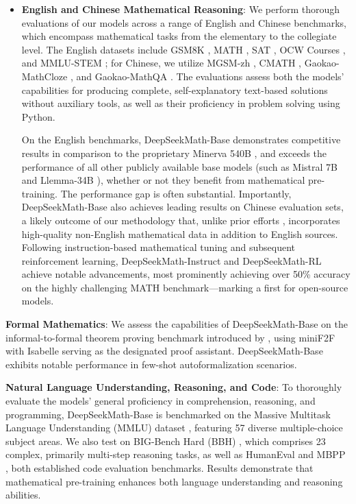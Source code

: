 \begin{itemize}[topsep=0pt]
    \item \textbf{English and Chinese Mathematical Reasoning}: We perform thorough evaluations of our models across a range of English and Chinese benchmarks, which encompass mathematical tasks from the elementary to the collegiate level. The English datasets include GSM8K \citep{gsm8k}, MATH \citep{MATH}, SAT \citep{llemma}, OCW Courses \citep{minerva}, and MMLU-STEM \citep{mmlu}; for Chinese, we utilize MGSM-zh \citep{mgsm}, CMATH \citep{wei2023cmath}, Gaokao-MathCloze \citep{agieval}, and Gaokao-MathQA \citep{agieval}. The evaluations assess both the models’ capabilities for producing complete, self-explanatory text-based solutions without auxiliary tools, as well as their proficiency in problem solving using Python.
    
    On the English benchmarks, DeepSeekMath-Base demonstrates competitive results in comparison to the proprietary Minerva 540B \citep{minerva}, and exceeds the performance of all other publicly available base models (such as Mistral 7B \citep{mistral} and Llemma-34B \citep{llemma}), whether or not they benefit from mathematical pre-training. The performance gap is often substantial. Importantly, DeepSeekMath-Base also achieves leading results on Chinese evaluation sets, a likely outcome of our methodology that, unlike prior efforts \citep{minerva, llemma}, incorporates high-quality non-English mathematical data in addition to English sources. Following instruction-based mathematical tuning and subsequent reinforcement learning, DeepSeekMath-Instruct and DeepSeekMath-RL achieve notable advancements, most prominently achieving over 50\% accuracy on the highly challenging MATH benchmark—marking a first for open-source models.
\end{itemize}

\item \textbf{Formal Mathematics}: We assess the capabilities of DeepSeekMath-Base on the informal-to-formal theorem proving benchmark introduced by \citep{dsp_proof}, using miniF2F \citep{minif2f} with Isabelle \citep{isabelle} serving as the designated proof assistant. DeepSeekMath-Base exhibits notable performance in few-shot autoformalization scenarios.
\item \textbf{Natural Language Understanding, Reasoning, and Code}: To thoroughly evaluate the models’ general proficiency in comprehension, reasoning, and programming, DeepSeekMath-Base is benchmarked on the Massive Multitask Language Understanding (MMLU) dataset \citep{mmlu}, featuring 57 diverse multiple-choice subject areas. We also test on BIG-Bench Hard (BBH) \citep{bbh}, which comprises 23 complex, primarily multi-step reasoning tasks, as well as HumanEval \citep{codex} and MBPP \citep{mbpp}, both established code evaluation benchmarks. Results demonstrate that mathematical pre-training enhances both language understanding and reasoning abilities.

